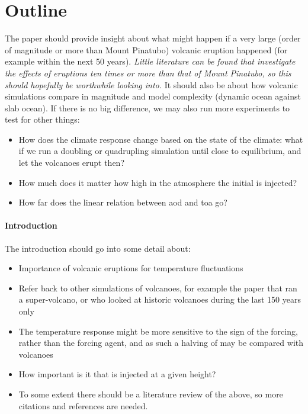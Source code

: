 \documentclass{ametsocV5}
\begin{document}
\section{Outline}

The paper should provide insight about what might happen if a very large (order of
magnitude or more than Mount Pinatubo) volcanic eruption happened (for example within
the next 50 years). \emph{Little literature can be found that investigate the effects
  of eruptions ten times or more than that of Mount Pinatubo, so this should hopefully be
  worthwhile looking into.} It should also be about how volcanic simulations compare in
magnitude and model complexity (dynamic ocean against slab ocean). If there is no big
difference, we may also run more experiments to test for other things:
\begin{itemize}
  \item How does the climate response change based on the state of the climate: what if we run
        a  doubling or quadrupling simulation until close to equilibrium, and let the
        volcanoes erupt then?
  \item How much does it matter how high in the atmosphere the initial  is injected?
  \item How far does the linear relation between \acrshort{aod} and \acrshort{toa} go?
\end{itemize}

\paragraph*{Introduction}

The introduction should go into some detail about:

\begin{itemize}
  \item Importance of volcanic eruptions for temperature fluctuations
  \item Refer back to other simulations of volcanoes, for example the \citet{jones2005} paper
        that ran a super-volcano, or \citet{gregory2016} who looked at historic volcanoes
        during the last 150 years only
  \item The temperature response might be more sensitive to the sign of the forcing, rather
        than the forcing agent, and as such a halving of  may be compared with
        volcanoes \citep{gunther2022}
  \item How important is it that  is injected at a given height?
  \item To some extent there should be a literature review of the above, so more citations and
        references are needed.
\end{itemize}
\end{document}
